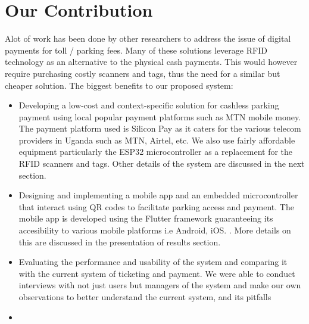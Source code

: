 \section{Our Contribution}
Alot of work has been done by other researchers to address the issue of digital payments for toll / parking fees. Many of these solutions leverage RFID technology as an alternative to the physical cash payments. This would however require purchasing costly scanners and tags, thus the need for a similar but cheaper solution.
The biggest benefits to our proposed system:
\begin{itemize}
    \item Developing a low-cost and context-specific solution for cashless parking payment using local popular payment platforms such as MTN mobile money. The payment platform used is Silicon Pay \cite{siliconpay} as it caters for the various telecom providers in Uganda such as MTN, Airtel, etc. We also use fairly affordable equipment particularly the ESP32 microcontroller as a replacement for the RFID scanners and tags. Other details of the system are discussed in the next section.
    \item Designing and implementing a mobile app and an embedded microcontroller that interact using QR codes to facilitate parking access and payment. The mobile app is developed using the Flutter framework guaranteeing its accesibility to various mobile platforms i.e Android, iOS. . More details on this are discussed in the presentation of results section.
    \item Evaluating the performance and usability of the system and comparing it with the current system of ticketing and payment. We were able to conduct interviews with not just users but managers of the system and make our own observations to better understand the current system, and its pitfalls
    \item
\end{itemize}
